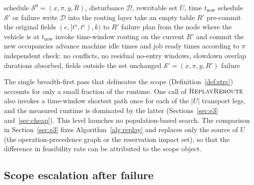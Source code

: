 \begin{algorithm}[t]
\caption{Level-1 rerouting replay \(\textsc{ReplayReroute}\)}
\label{alg:replay}
\begin{algorithmic}[1]
\Require schedule \(\mathcal{S}^0=(x,\pi,y,R)\), disturbance \(\mathcal{D}\), rewritable set \(U\), time \(t_{\mathrm{now}}\)
\Ensure schedule \(\mathcal{S}'\) or failure
\State write \(\mathcal{D}\) into the routing layer
\State take an empty table \(R'\)
  \State pre-commit the original fields \((e,[t^s,t^e),k)\) to \(R'\)
    \State \Return failure
  \EndIf
\EndFor
{}
  \State plan from the node where the vehicle is at \(t_{\mathrm{now}}\) 
  \State invoke time-window routing on the current \(R'\) and commit the new occupancies
\EndFor
\State advance machine idle times and job ready times according to \(\pi\)
\State independent check: no conflicts, no residual no-entry windows, slowdown overlap durations absorbed, fields outside the set unchanged
  \State \Return \(\mathcal{S}'=(x,\pi,y,R')\)
\Else
  \State \Return failure
\EndIf
\end{algorithmic}
\end{algorithm}

The single breadth-first pass that delineates the scope (Definition~\ref{def:strc}) accounts for only a small fraction of the runtime. One call of
\(\textsc{ReplayReroute}\) also invokes a time-window shortest path once for each of the \(|U|\) transport legs,
and the measured runtime is dominated by the latter (Sections~\ref{sec:e3} and~\ref{sec:cheap}).
This level launches no population-based search. The comparison in Section~\ref{sec:e3} fixes Algorithm~\ref{alg:replay} and replaces only the source of \(U\) (the operation-precedence graph or the reservation impact set),
so that the difference in feasibility rate can be attributed to the scope object.

\subsection{Scope escalation after failure}
\label{sec:scope_escalation}

